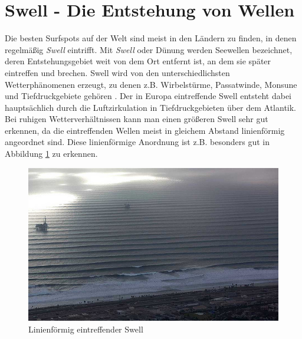 \section{Swell - Die Entstehung von Wellen}
Die besten Surfspots auf der Welt sind meist in den Ländern zu finden,
in denen regelmäßig \textit{Swell} eintrifft. Mit \textit{Swell} oder
Dünung werden Seewellen bezeichnet, deren Entstehungs\-gebiet weit von
dem Ort entfernt ist, an dem sie später eintreffen und brechen. Swell
wird von den unterschiedlichsten Wetter\-phänomenen erzeugt, zu denen
z.B. Wirbelstürme, Passatwinde, Monsune und Tiefdruckgebiete gehören
\cite[S.15]{storm_europe_1998}. Der in Europa eintreffende Swell
entsteht dabei hauptsächlich durch die Luftzirkulation in
Tiefdruckgebieten über dem Atlantik. Bei ruhigen Wetterverhältnissen
kann man einen größeren Swell sehr gut erkennen, da die eintreffenden
Wellen meist in gleichem Abstand linienförmig angeordnet sind. Diese
linienförmige Anordnung ist z.B. besonders gut in Abbildung
\ref{swell-lines} zu erkennen.

\begin{figure}[h]
 \includegraphics[width=\textwidth]{bilder/swell}
 \caption{Linienförmig eintreffender Swell}
 \label{swell-lines}
\end{figure}

